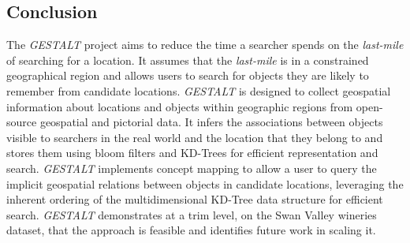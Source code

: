 \subsection{Conclusion}
The \textit{GESTALT} project aims to reduce the time a searcher spends on the \textit{last-mile} of searching for a location. 
It assumes that the \textit{last-mile} is in a constrained geographical region and allows users to search for objects they are likely to remember from candidate locations. 
\textit{GESTALT} is designed to collect geospatial information about locations and objects within geographic regions from open-source geospatial and pictorial data. 
It infers the associations between objects visible to searchers in the real world and the location that they belong to and stores them using bloom filters and KD-Trees for efficient representation and search.
\textit{GESTALT} implements concept mapping to allow a user to query the implicit geospatial relations between objects in candidate locations, leveraging the inherent ordering of the multidimensional KD-Tree data structure for efficient search. 
\textit{GESTALT} demonstrates at a trim level, on the Swan Valley wineries dataset, that the approach is feasible and identifies future work in scaling it.